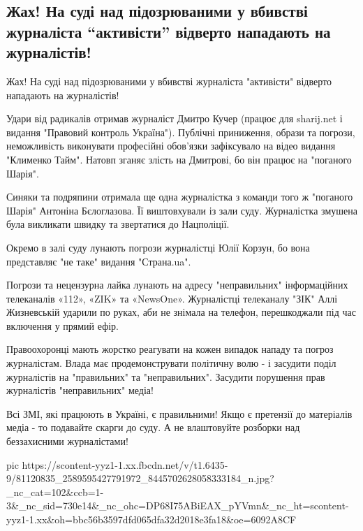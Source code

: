  
 
 
 
 
\subsection{Жах! На суді над підозрюваними у вбивстві журналіста  \enquote{активісти} відверто нападають на журналістів! }

Жах! На суді над підозрюваними у вбивстві журналіста  "активісти" відверто нападають на журналістів! 

Удари від радикалів отримав журналіст Дмитро Кучер (працює для sharij.net і
видання "Правовий контроль Україна"). Публічні приниження, образи та погрози,
неможливість виконувати професійні обов'язки зафіксувало на відео  видання
"Клименко Тайм". Натовп зганяє злість на Дмитрові, бо він працює на "поганого
Шарія".

Синяки та подряпини отримала ще одна журналістка з команди того ж "поганого
Шарія" Антоніна Бєлоглазова. Її виштовхували із зали суду. Журналістка змушена
була викликати швидку та звертатися до Нацполіції.

Окремо в залі суду лунають погрози журналістці Юлії Корзун, бо вона представляє
"не таке" видання "Страна.ua".

Погрози та нецензурна лайка лунають на адресу "неправильних" інформаційних
телеканалів «112», «ZIK» та «NewsOne». Журналістці телеканалу "ЗІК" Аллі
Жизневській ударили по руках, аби не знімала на телефон, перешкоджали під час
включення у прямий ефір.

Правоохоронці мають жорстко реагувати на кожен випадок нападу та погроз
журналістам. Влада має продемонструвати політичну волю - і засудити поділ
журналістів на "правильних" та "неправильних". Засудити порушення прав
журналістів "неправильних" медіа!

Всі ЗМІ, які працюють в Україні, є правильними! Якщо є претензії до матеріалів
медіа - то подавайте скарги до суду. А не влаштовуйте розборки над беззахисними
журналістами!

\ifcmt
  pic https://scontent-yyz1-1.xx.fbcdn.net/v/t1.6435-9/81120835_2589595427791972_8445702628058333184_n.jpg?_nc_cat=102&ccb=1-3&_nc_sid=730e14&_nc_ohc=DP68I75ABiEAX_pYVmn&_nc_ht=scontent-yyz1-1.xx&oh=bbc56b3597dfd065dfa32d2018e3fa18&oe=6092A8CF
\fi

